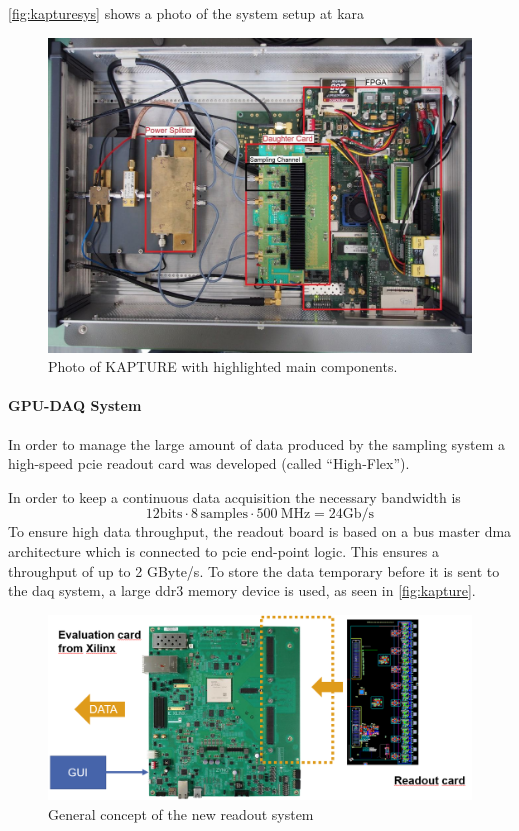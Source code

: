 \autoref{fig:kapturesys} shows a photo of the system setup at \gls{kara}
\begin{figure}[tbh]
	\centering
	\includegraphics[width = \textwidth]{chap/03-currentStat/img/kapture_sys}
	\caption[Photo of KAPTURE system]{Photo of KAPTURE with highlighted main components. \cite[p.~61]{brosi}}
	\label{fig:kapturesys}
\end{figure}



\paragraph{GPU-DAQ System}
In order to manage the large amount of data produced by the sampling system a high-speed \gls{pcie} readout card was developed (called ``High-Flex'').

In order to keep a continuous data  acquisition the necessary bandwidth is 
\begin{equation}
	12 \text{bits} \cdot 8 \, \text{samples} \cdot \SI{500}{\mega \hertz} = 24 \text{Gb/s}
\end{equation}
To ensure high data throughput, the readout board is based on a bus master \gls{dma} architecture which is connected to \gls{pcie} end-point logic. 
This ensures a throughput of up to 2 GByte/s. 
To store the data temporary before it is sent to the \gls{daq} system, a large \gls{ddr}3 memory device is used, as seen in \autoref{fig:kapture}. \cite{caselleKAP}
\begin{figure}[tbh]
	\centering
	\includegraphics[width = \textwidth]{chap/04-work/img/concept_theresa}
	\caption{General concept of the new readout system}
	\label{fig:concept_theresa}
\end{figure}

